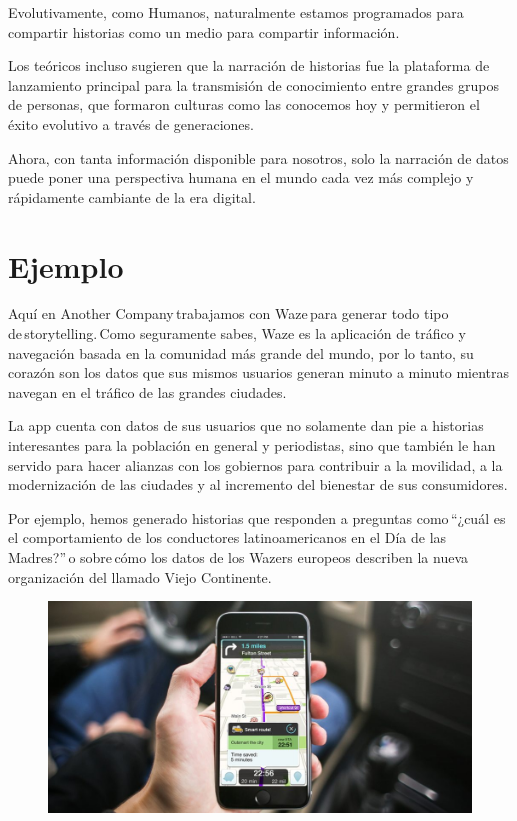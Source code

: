 {{{Evolutivamente, como Humanos, naturalmente estamos programados para compartir historias como un medio para compartir información.

Los teóricos incluso sugieren que la narración de historias fue la plataforma de lanzamiento principal para la transmisión de conocimiento entre grandes grupos de personas, que formaron culturas como las conocemos hoy y permitieron el éxito evolutivo a través de generaciones.

Ahora, con tanta información disponible para nosotros, solo la narración de datos puede poner una perspectiva humana en el mundo cada vez más complejo y rápidamente cambiante de la era digital.}

\section{Ejemplo}

\item{Aquí en Another Company trabajamos con Waze para generar todo tipo de storytelling. Como seguramente sabes, Waze es la aplicación de tráfico y navegación basada en la comunidad más grande del mundo, por lo tanto, su corazón son los datos que sus mismos usuarios generan minuto a minuto mientras navegan en el tráfico de las grandes ciudades. 

La app cuenta con datos de sus usuarios que no solamente dan pie a historias interesantes para la población en general y periodistas, sino que también le han servido para hacer alianzas con los gobiernos para contribuir a la movilidad, a la modernización de las ciudades y al incremento del bienestar de sus consumidores. 

Por ejemplo, hemos generado historias que responden a preguntas como “¿cuál es el comportamiento de los conductores latinoamericanos en el Día de las Madres?” o sobre cómo los datos de los Wazers europeos describen la nueva organización del llamado Viejo Continente. }

\begin{figure}[htb]
\begin{center}
\includegraphics[width=15cm]{./Imagenes/waze2}
\end{center}
\end{figure}

}}
